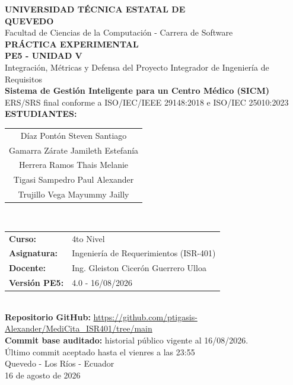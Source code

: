 \documentclass[11pt,a4paper]{article}
\begin{document}
	\begin{titlepage}\centering
		{\LARGE\bfseries UNIVERSIDAD TÉCNICA ESTATAL DE \\[0.5cm]
			QUEVEDO    }\\[0.95cm]
		{\large Facultad de Ciencias de la Computación - Carrera de Software}\\[1.0cm]
		{\Large\bfseries PRÁCTICA EXPERIMENTAL\\
			 PE5 - UNIDAD V}\\[0.25cm]
		{\large Integración, Métricas y Defensa del Proyecto Integrador de Ingeniería de Requisitos}\\[0.9cm]
		{\LARGE\bfseries Sistema de Gestión Inteligente para un Centro Médico (SICM)}\\[0.95cm]
		{\large ERS/SRS final conforme a ISO/IEC/IEEE 29148:2018 e ISO/IEC 25010:2023}\\[1cm]
		
		
			{\large\bfseries ESTUDIANTES:}\\[0.3cm]
	\begin{tabular}{c}
		Díaz Pontón Steven Santiago \\
		Gamarra Zárate Jamileth Estefanía \\
		Herrera Ramos Thais Melanie \\
		Tigasi Sampedro Paul Alexander \\
		Trujillo Vega Mayummy Jailly
	\end{tabular}\\[1.2cm]
		
		\begin{tabular}{ll}\textbf{Curso:}&4to Nivel\\\textbf{Asignatura:}&Ingeniería de Requerimientos (ISR-401)\\\textbf{Docente:}&Ing. Gleiston Cicerón Guerrero Ulloa\\\textbf{Versión PE5:}&4.0 - 16/08/2026\end{tabular}\\[0.8cm]
		{\small\textbf{Repositorio GitHub:} \url{https://github.com/ptigasis-Alexander/MediCita_ISR401/tree/main}}\\[1.3cm]
		{\small\textbf{Commit base auditado:} historial público vigente al 16/08/2026.}\\
		Último commit aceptado hasta el vienres a las 23:55\\
		\vfill Quevedo - Los Ríos - Ecuador\\16 de agosto de 2026
	\end{titlepage}
	
\end{document}
